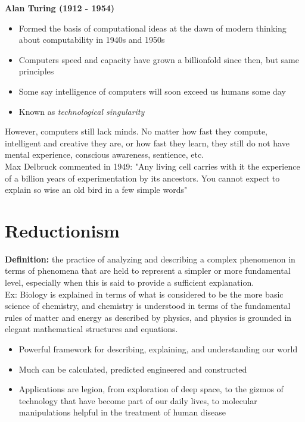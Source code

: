 \documentclass{article}
\begin{document}
\noindent \textbf{Alan Turing (1912 - 1954)}
\begin{itemize}
    \item Formed the basis of computational ideas at the dawn of modern thinking about computability in 1940s and 1950s
    \item Computers speed and capacity have grown a billionfold since then, but same principles
    \item Some say intelligence of computers will soon exceed us humans some day
    \item Known as \textit{technological singularity}
\end{itemize}

However, computers still lack minds. No matter how fast they compute, intelligent and creative they are, or how fast they learn, they still do not have mental experience, conscious awareness, sentience, etc. \\

Max Delbruck commented in 1949: "Any living cell carries with it the  experience of a billion years of experimentation by its ancestors. You cannot expect to explain so wise an old bird in a few simple words" \\

\section{Reductionism}
\textbf{Definition:} the practice of analyzing and describing a complex phenomenon in terms of phenomena that are held to represent a simpler or more fundamental level, especially when this is said to provide a sufficient explanation. \\

Ex: Biology is explained in terms of what is considered to be the more basic science of chemistry, and chemistry is understood in terms of the fundamental rules of matter and energy as described by physics, and physics is grounded in elegant mathematical structures and equations. \\ 

\begin{itemize}
    \item Powerful framework for describing, explaining, and understanding our world
    \item Much can be calculated, predicted engineered and constructed
    \item Applications are legion, from exploration of deep space, to the gizmos of technology that have become part of our daily lives, to molecular manipulations helpful in the treatment of human disease
\end{itemize}
\end{document}
